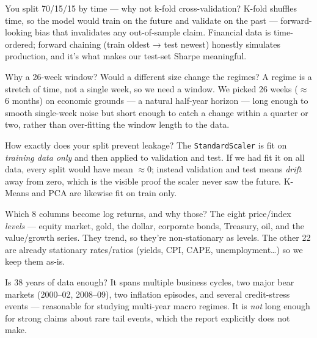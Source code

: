 \documentclass[11pt]{article}
\newcommand{\setp}[2]{\colorlet{accent}{#1}\colorlet{accentl}{#2}}
\begin{document}
\begin{qa}{You split 70/15/15 by time --- why not k-fold cross-validation?}
K-fold shuffles time, so the model would train on the future and validate on the
past --- forward-looking bias that invalidates any out-of-sample claim. Financial
data is time-ordered; forward chaining (train oldest → test newest) honestly
simulates production, and it's what makes our test-set Sharpe meaningful.
\end{qa}

\begin{qa}{Why a 26-week window? Would a different size change the regimes?}
A regime is a stretch of time, not a single week, so we need a window. We picked 26
weeks ($\approx$ 6 months) on economic grounds --- a natural half-year horizon ---
long enough to smooth single-week noise but short enough to catch a change within a
quarter or two, rather than over-fitting the window length to the data.
\end{qa}

\begin{qa}{How exactly does your split prevent leakage?}
The \texttt{StandardScaler} is fit on \emph{training data only} and then applied to
validation and test. If we had fit it on all data, every split would have mean
$\approx 0$; instead validation and test means \emph{drift} away from zero, which is
the visible proof the scaler never saw the future. K-Means and PCA are likewise fit
on train only.
\end{qa}

\begin{qa}{Which 8 columns become log returns, and why those?}
The eight price/index \emph{levels} --- equity market, gold, the dollar, corporate
bonds, Treasury, oil, and the value/growth series. They trend, so they're
non-stationary as levels. The other 22 are already stationary rates/ratios (yields,
CPI, CAPE, unemployment\ldots) so we keep them as-is.
\end{qa}

\begin{qa}{Is 38 years of data enough?}
It spans multiple business cycles, two major bear markets (2000–02, 2008–09), two
inflation episodes, and several credit-stress events --- reasonable for studying
multi-year macro regimes. It is \emph{not} long enough for strong claims about rare
tail events, which the report explicitly does not make.
\end{qa}

\setp{p2}{p2l}
\end{document}
